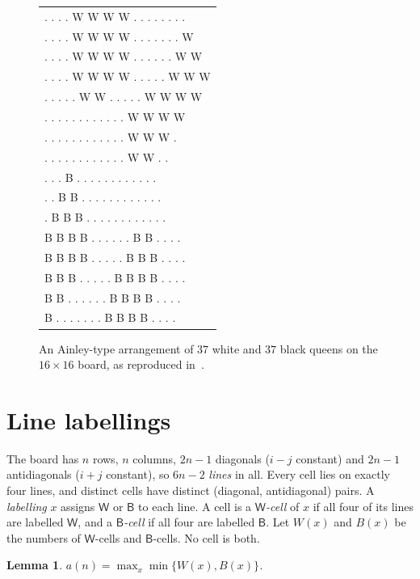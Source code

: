 \documentclass[11pt]{article}
\newtheorem{lemma}[theorem]{Lemma}
\theoremstyle{remark}
\newcommand{\W}{\mathsf W}
\newcommand{\B}{\mathsf B}
\begin{document}
\begin{figure}[htbp]
\centering
{\small\ttfamily
\begin{tabular}{l}
. . . . W W W W . . . . . . . .\\
. . . . W W W W . . . . . . . W\\
. . . . W W W W . . . . . . W W\\
. . . . W W W W . . . . . W W W\\
. . . . . W W . . . . . W W W W\\
. . . . . . . . . . . . W W W W\\
. . . . . . . . . . . . W W W .\\
. . . . . . . . . . . . W W . .\\
. . . B . . . . . . . . . . . .\\
. . B B . . . . . . . . . . . .\\
. B B B . . . . . . . . . . . .\\
B B B B . . . . . . B B . . . .\\
B B B B . . . . . B B B . . . .\\
B B B . . . . . B B B B . . . .\\
B B . . . . . . B B B B . . . .\\
B . . . . . . . B B B B . . . .
\end{tabular}}
\caption{An Ainley-type arrangement of $37$ white and $37$ black queens on the $16\times16$ board, as
reproduced in~\cite{OEIS}.}\label{fig:16}
\end{figure}

\section{Line labellings}

The board has $n$ rows, $n$ columns, $2n-1$ diagonals ($i-j$ constant) and $2n-1$ antidiagonals
($i+j$ constant), so $6n-2$ \emph{lines} in all. Every cell lies on exactly four lines, and distinct
cells have distinct (diagonal, antidiagonal) pairs. A \emph{labelling} $x$ assigns $\W$ or $\B$ to each
line. A cell is a \emph{$\W$-cell} of $x$ if all four of its lines are labelled $\W$, and a
\emph{$\B$-cell} if all four are labelled $\B$. Let $W(x)$ and $B(x)$ be the numbers of $\W$-cells and
$\B$-cells. No cell is both.

\begin{lemma}\label{lem:label}
$a(n)=\max_x\min\{W(x),B(x)\}$.
\end{lemma}
\end{document}
